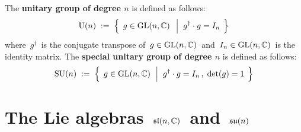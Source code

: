
\vskip 0.5cm
\begin{definition}
\mbox{}
\vskip 0.1cm
\noindent
The \textbf{unitary group of degree $n$} is defined as follows:
\begin{equation*}
\textnormal{U}(n)
\; := \;
	\left\{\;\,
		g \overset{{\color{white}.}}{\in} \textnormal{GL}(n,\C)
		\;\;\left\vert\;\;
			g^{\dagger} \cdot g \overset{{\color{white}1}}{=} I_{n}
			\right.
		\;\right\}
\end{equation*}
where \,$g^{\dagger}$\, is the conjugate transpose of
\,$g \in \textnormal{GL}(n,\mathbb{C})$\,
and
\,$I_{n} \in \textnormal{GL}(n,\mathbb{C})$\,
is the identity matrix.
\vskip 0.1cm
\noindent
The \textbf{special unitary group of degree $n$} is defined as follows:
\begin{equation*}
\textnormal{SU}(n)
\; := \;
	\left\{\;\,
		g \overset{{\color{white}.}}{\in} \textnormal{GL}(n,\C)
		\;\,\left\vert\;\;
			g^{\dagger} \cdot g \overset{{\color{white}1}}{=} I_{n}\,,
			\;
			\textnormal{det}(g) = 1
			\right.
		\;\right\}
\end{equation*}
\end{definition}


\vskip 1.0cm
\section{The Lie algebras  \,$\mathfrak{sl}(n,\mathbb{C})$\, and \,$\mathfrak{su}(n)$}


